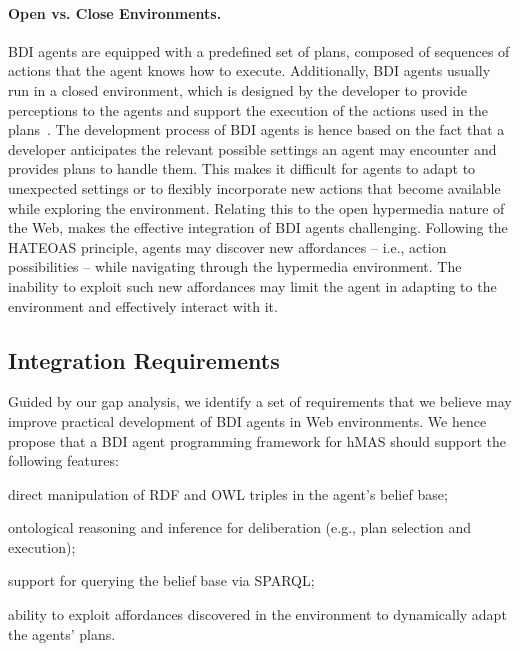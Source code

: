 \documentclass[
]{ceurart}
\begin{document}
\paragraph{Open vs. Close Environments.}

\ac{BDI} agents are equipped with a predefined set of plans, composed of sequences of actions that the agent knows how to execute.
%
Additionally, \ac{BDI} agents usually run in a closed environment,
which is designed by the developer to provide perceptions to the agents and
support the execution of the actions used in the plans~\cite{weyns2007aamas}.
%
The development process of \ac{BDI} agents is hence based on the fact that a developer anticipates
the relevant possible settings an agent may encounter and provides plans to handle them.
%
This makes it difficult for agents to adapt to unexpected settings or to flexibly incorporate new actions that become available while exploring the environment.
%
Relating this to the open hypermedia nature of the Web, makes the effective integration of \ac{BDI} agents challenging.
%
Following the \ac{HATEOAS} principle, agents may discover new affordances
-- i.e., action possibilities --
while navigating through the hypermedia environment.
%
The inability to exploit such new affordances may limit the agent in adapting to the environment and effectively interact with it.

\subsection{Integration Requirements}
\label{sec:integrating-bdi-hypermedia}

Guided by our gap analysis,
we identify a set of requirements that we believe may improve practical development of \ac{BDI} agents in Web environments.
%
We hence propose that a \ac{BDI} agent programming framework for \ac{hMAS} should support the following features:
%
\begin{enumerate*}[label=\textbf{(R\arabic*)}]
  \item direct manipulation of \ac{RDF} and \ac{OWL} triples in the agent's belief base;
  \label{req:direct}

  \item ontological reasoning and inference for deliberation (e.g., plan selection and execution);
  \label{req:reasoning}

  \item support for querying the belief base via \acs{SPARQL};
  \label{req:query}

  \item ability to exploit affordances discovered in the environment to dynamically adapt the agents' plans.
  \label{req:actions}
\end{enumerate*}
\end{document}
